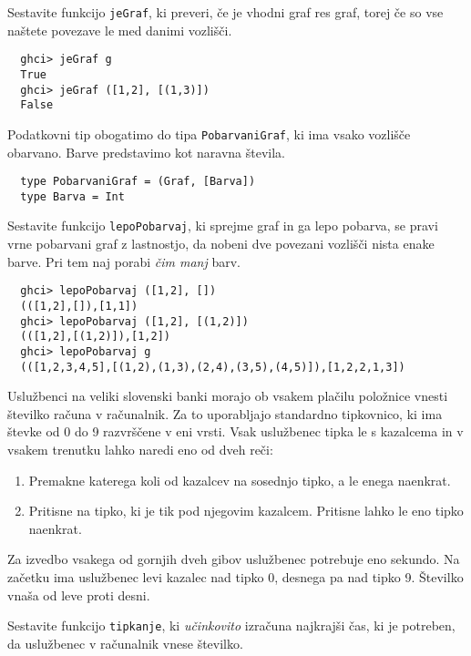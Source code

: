 \documentclass[arhiv]{../izpit}
\begin{document}
\podnaloga
  Sestavite funkcijo \texttt{jeGraf}, ki preveri, če je vhodni
  graf res graf, torej če so vse naštete povezave le med danimi vozlišči.
  \begin{verbatim}
  ghci> jeGraf g
  True
  ghci> jeGraf ([1,2], [(1,3)])
  False
  \end{verbatim}

\podnaloga
  Podatkovni tip obogatimo do tipa \texttt{PobarvaniGraf}, ki ima
  vsako vozlišče obarvano. Barve predstavimo kot naravna števila.

  \begin{verbatim}
  type PobarvaniGraf = (Graf, [Barva])
  type Barva = Int
  \end{verbatim}

  Sestavite funkcijo \texttt{lepoPobarvaj}, ki sprejme graf in 
  ga lepo pobarva, se pravi vrne pobarvani graf z lastnostjo, 
  da nobeni dve povezani vozlišči nista enake barve. Pri tem naj porabi
  \emph{čim manj} barv.
  \begin{verbatim}
  ghci> lepoPobarvaj ([1,2], [])
  (([1,2],[]),[1,1])
  ghci> lepoPobarvaj ([1,2], [(1,2)])
  (([1,2],[(1,2)]),[1,2])
  ghci> lepoPobarvaj g
  (([1,2,3,4,5],[(1,2),(1,3),(2,4),(3,5),(4,5)]),[1,2,2,1,3])
  \end{verbatim}


  Uslužbenci na veliki slovenski banki morajo ob vsakem plačilu položnice vnesti številko računa v računalnik.
  Za to uporabljajo standardno tipkovnico, ki ima števke od
  0 do 9 razvrščene v eni vrsti. Vsak uslužbenec tipka le s
  kazalcema in v vsakem trenutku lahko naredi eno od dveh reči:

  \begin{enumerate}
    \item Premakne katerega koli od kazalcev na sosednjo tipko, a
    le enega naenkrat.
    \item Pritisne na tipko, ki je tik pod njegovim kazalcem. Pritisne
    lahko le eno tipko naenkrat.
  \end{enumerate}

 Za izvedbo vsakega od gornjih dveh gibov uslužbenec potrebuje eno sekundo. Na začetku ima uslužbenec levi kazalec nad tipko 0, desnega
 pa nad tipko 9. Številko vnaša od leve proti desni.

 Sestavite funkcijo \texttt{tipkanje}, ki {\em učinkovito}
 izračuna najkrajši čas, ki je potreben, da uslužbenec v
 računalnik vnese številko.
\end{document}
